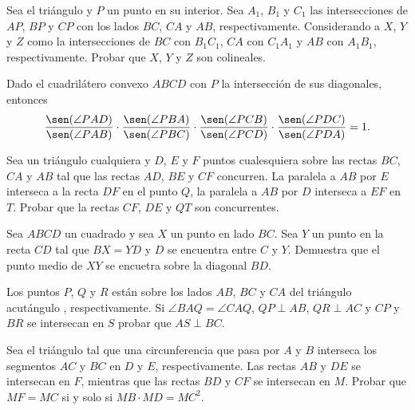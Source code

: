 \begin{section-problem}
    Sea el triángulo  y $P$ un punto en su interior.
    Sea $A_1$, $B_1$ y $C_1$ las intersecciones de $AP$, $BP$ y $CP$ con los lados $BC$, $CA$ y $AB$, respectivamente.
    Considerando a $X$, $Y$ y $Z$ como la intersecciones de $BC$ con $B_1 C_1$, $CA$ con $C_1 A_1$ y $AB$ con $A_1 B_1$, respectivamente.
    Probar que $X$, $Y$ y $Z$ son colineales.
\end{section-problem}

\begin{section-problem}
    Dado el cuadrilátero convexo $ABCD$ con $P$ la intersección de sus diagonales, entonces
    \[
        \frac{\sen(\angle PAD)}{\sen(\angle PAB)} \cdot \frac{\sen(\angle PBA)}{\sen(\angle PBC)} \cdot \frac{\sen(\angle PCB)}{\sen(\angle PCD)} \cdot \frac{\sen(\angle PDC)}{\sen(\angle PDA)} = 1.
    \]
\end{section-problem}

\begin{section-problem}
    Sea  un triángulo cualquiera y $D$, $E$ y $F$ puntos cualesquiera sobre las rectas $BC$, $CA$ y $AB$ tal que las rectas $AD$, $BE$ y $CF$ concurren.
    La paralela a $AB$ por $E$ interseca a la recta $DF$ en el punto $Q$, la paralela a $AB$ por $D$ interseca a $EF$ en $T$.
    Probar que la rectas $CF$, $DE$ y $QT$ son concurrentes.
\end{section-problem}

\begin{section-problem}
    Sea $ABCD$ un cuadrado y sea $X$ un punto en lado $BC$.
    Sea $Y$ un punto en la recta $CD$ tal que $BX = YD$ y $D$ se encuentra entre $C$ y $Y$.
    Demuestra que el punto medio de $XY$ se encuetra sobre la diagonal $BD$.
\end{section-problem}

\begin{section-problem}
    Los puntos $P$, $Q$ y $R$ están sobre los lados $AB$, $BC$ y $CA$ del triángulo acutángulo , respectivamente.
    Si $\angle BAQ = \angle CAQ$, $QP \perp AB$, $QR \perp AC$ y $CP$ y $BR$ se intersecan en $S$ probar que $AS \perp BC$.
\end{section-problem}

\begin{section-problem}
    Sea el triángulo  tal que una circunferencia que pasa por $A$ y $B$ interseca los segmentos $AC$ y $BC$ en $D$ y $E$, respectivamente.
    Las rectas $AB$ y $DE$ se intersecan en $F$, mientras que las rectas $BD$ y $CF$ se intersecan en $M$.
    Probar que $MF = MC$ si y solo si $MB \cdot MD = MC^2$.
\end{section-problem}

